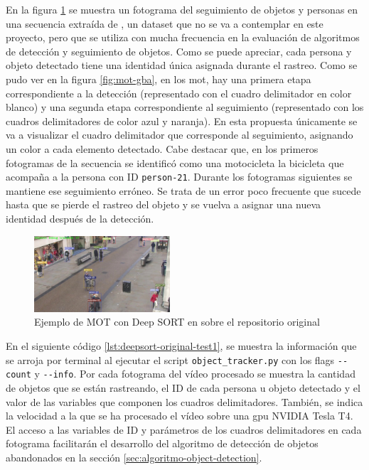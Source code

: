 En la figura \ref{fig:prueba-deepsort-frame53} se muestra un fotograma del seguimiento de objetos y personas en una secuencia extraída de \cite{Benfold2011StableMT}, un dataset que no se va a contemplar en este proyecto, pero que se utiliza con mucha frecuencia en la evaluación de algoritmos de detección y seguimiento de objetos. Como se puede apreciar, cada persona y objeto detectado tiene una identidad única asignada durante el rastreo. Como se pudo ver en la figura \ref{fig:mot-gba}, en los \gls{mot}, hay una primera etapa correspondiente a la detección (representado con el cuadro delimitador en color blanco) y una segunda etapa correspondiente al seguimiento (representado con los cuadros delimitadores de color azul y naranja). En esta propuesta únicamente se va a visualizar el cuadro delimitador que corresponde al seguimiento, asignando un color a cada elemento detectado. Cabe destacar que, en los primeros fotogramas de la secuencia se identificó como una motocicleta la bicicleta que acompaña a la persona con ID \texttt{person-21}. Durante los fotogramas siguientes se mantiene ese seguimiento erróneo. Se trata de un error poco frecuente que sucede hasta que se pierde el rastreo del objeto y se vuelva a asignar una nueva identidad después de la detección.

\begin{figure}[ht]
\centering
\includegraphics[width=0.45\textwidth]{img/chapters/desarrollo/prueba-deepsort-frame53.jpg}
\caption{\label{fig:prueba-deepsort-frame53}Ejemplo de MOT con Deep SORT en \cite{Benfold2011StableMT} sobre el repositorio original \cite{yolov4-deepsort}}
\end{figure}

En el siguiente código \ref{lst:deepsort-original-test1}, se muestra la información que se arroja por terminal al ejecutar el script \texttt{object\_tracker.py} con los flags \texttt{-{}-count} y \texttt{-{}-info}. Por cada fotograma del vídeo procesado se muestra la cantidad de objetos que se están rastreando, el ID de cada persona u objeto detectado y el valor de las variables que componen los cuadros delimitadores. También, se indica la velocidad a la que se ha procesado el vídeo sobre una \gls{gpu} NVIDIA Tesla T4. El acceso a las variables de ID y parámetros de los cuadros delimitadores en cada fotograma facilitarán el desarrollo del algoritmo de detección de objetos abandonados en la sección \ref{sec:algoritmo-object-detection}.

